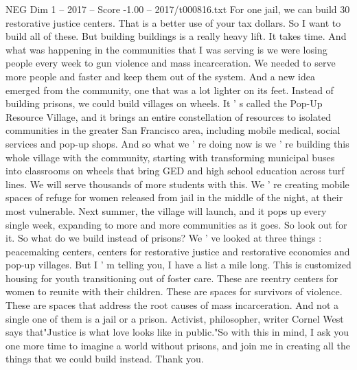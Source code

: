 \begin{textsample}{NEG Dim 1 – 2017 – Score -1.00 – 2017/t000816.txt}
For one jail, we can build 30 restorative justice centers.
That is a better use of your tax dollars.
So I want to build all of these.
But building buildings is a really heavy lift.
It takes time.
And what was happening in the communities that I was serving is we were losing people every week to gun violence and mass incarceration.
We needed to serve more people and faster and keep them out of the system.
And a new idea emerged from the community, one that was a lot lighter on its feet.
Instead of building prisons, we could build villages on wheels.
It ' s called the Pop-Up Resource Village, and it brings an entire constellation of resources to isolated communities in the greater San Francisco area, including mobile medical, social services and pop-up shops.
And so what we ' re doing now is we ' re building this whole village with the community, starting with transforming municipal buses into classrooms on wheels that bring GED and high school education across turf lines.
We will serve thousands of more students with this.
We ' re creating mobile spaces of refuge for women released from jail in the middle of the night, at their most vulnerable.
Next summer, the village will launch, and it pops up every single week, expanding to more and more communities as it goes.
So look out for it.
So what do we build instead of prisons?
We ' ve looked at three things : peacemaking centers, centers for restorative justice and restorative economics and pop-up villages.
But I ' m telling you, I have a list a mile long.
This is customized housing for youth transitioning out of foster care.
These are reentry centers for women to reunite with their children.
These are spaces for survivors of violence.
These are spaces that address the root causes of mass incarceration.
And not a single one of them is a jail or a prison.
Activist, philosopher, writer Cornel West says that"Justice is what love looks like in public."So with this in mind, I ask you one more time to imagine a world without prisons, and join me in creating all the things that we could build instead.
Thank you.

\end{textsample}
